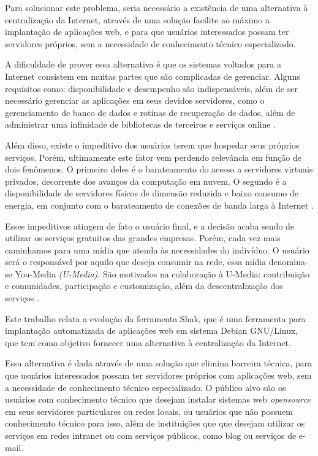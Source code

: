 Para solucionar este problema, seria necessário a existência de uma alternativa à 
centralização da Internet, através de uma solução facilite ao máximo a implantação de aplicações web, e 
para que usuários interessados possam ter servidores próprios, 
sem a necessidade de conhecimento técnico especializado.

A dificuldade de prover essa alternativa é que os sistemas voltados para a
Internet consistem em muitas partes que são complicadas de gerenciar. Alguns
requisitos como: disponibilidade e desempenho são indispensáveis, além de ser
necessário gerenciar as aplicações em seus devidos servidores, como o gerenciamento de
banco de dados e rotinas de recuperação de dados, além de administrar uma
infinidade de bibliotecas de terceiros e serviços online \cite{6265084}.

Além disso, existe o impeditivo dos usuários terem que hospedar seus 
próprios serviços. Porém, ultimamente este fator vem perdendo relevância em função de
dois fenômenos. O primeiro deles é o barateamento do acesso a servidores virtuais
privados, decorrente dos avanços da computação em nuvem. O segundo é a
disponibilidade de servidores físicos de dimensão reduzida e baixo consumo de
energia, em conjunto com o barateamento de conexões de banda larga à Internet \cite{shak2015}.

Esses impeditivos atingem de fato o usuário final, e a decisão
acaba sendo de utilizar os serviços gratuitos das grandes empresas. Porém, 
cada vez mais caminhamos para uma mídia que atenda às necessidades do indivíduo. 
O usuário será o responsável por aquilo que deseja consumir na rede, essa mídia 
denomina-se You-Media \textit{(U-Media)}. São motivados na colaboração à U-Media: contribuição 
e comunidades, participação e customização, além da descentralização dos 
serviços \cite{terra2006comunicaccao}. 

Este trabalho relata a evolução da ferramenta Shak, que é uma ferramenta para implantação
automatizada de aplicações web em sistema Debian GNU/Linux, que tem como objetivo fornecer
uma alternativa à centralização da Internet. 

Essa alternativa é dada através de uma solução que elimina barreira técnica, para que usuários interessados possam 
ter servidores próprios com aplicações web, sem a necessidade de conhecimento técnico 
especializado. O público alvo são os usuários com conhecimento técnico que desejam
instalar sistemas web \textit{opensource} em seus servidores particulares ou redes
locais, ou usuários que não possuem conhecimento técnico para isso, além de 
instituições que que desejam utilizar os serviços em redes intranet ou com serviços
públicos, como blog ou serviços de e-mail.


